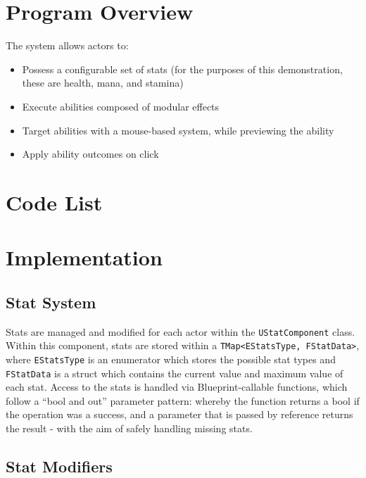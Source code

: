 \documentclass{article}
\begin{document}
\section{Program Overview}

The system allows actors to:
\begin{itemize}
    \item Possess a configurable set of stats (for the purposes of this demonstration, these are health, mana, and stamina)
    \item Execute abilities composed of modular effects
    \item Target abilities with a mouse-based system, while previewing the ability
    \item Apply ability outcomes on click
\end{itemize}

\section{Code List}


\section{Implementation}

\subsection{Stat System}

Stats are managed and modified for each actor within the \texttt{UStatComponent} class. Within this component, stats are stored within a \texttt{TMap<EStatsType, FStatData>}, where \texttt{EStatsType} is an enumerator which stores the possible stat types and \texttt{FStatData} is a struct which contains the current value and maximum value of each stat. 
Access to the stats is handled via Blueprint-callable functions, which follow a “bool and out” parameter pattern: whereby the function returns a bool if the operation was a success, and a parameter that is passed by reference returns the result - with the aim of safely handling missing stats.

\subsection{Stat Modifiers}
\end{document}
